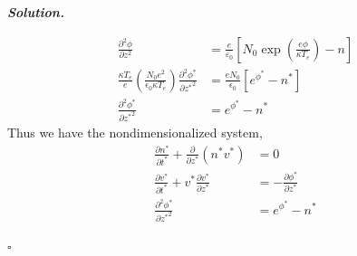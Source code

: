 \documentclass[12pt]{report}
\newenvironment{solution}[1][\it{Solution}]{\textbf{#1. } }{$\square$}
\def\eps{{\epsilon}}
\newcommand{\paren}[1]{{\left(#1\right)}} %
\newcommand{\pp}[2]{\frac{\partial #1}{\partial #2}} %
\newcommand{\ppn}[3]{\frac{\partial^{#1} #2}{\partial #3^{#1}}} %
\begin{document}
\begin{solution}
\begin{enumerate}
    \begin{align*}
        \ppn{2}{\phi}{z}&= \frac{e}{\varepsilon_0}\left[N_0 \exp\left(\frac{e\phi}{\kappa T_e}\right)-n\right]\\
        \frac{\kappa T_e}{e} \paren{\frac{N_0 e^2}{\epsilon_0 \kappa T_e}}\ppn{2}{{\phi^*}}{{z^*}} &= \frac{eN_0}{\eps_0} \left[ e^{\phi^*} - n^* \right]\\
        \ppn{2}{{\phi^*}}{{z^*}} &= e^{\phi^*} - n^*
    \end{align*}
    Thus we have the nondimensionalized system,
    \begin{align*}
        \pp{n^*}{t^*}+\pp{}{z^*}(n^*v^*)&=0\\
        \pp{v^*}{t^*}+v^*\pp{v^*}{z^*}&= -\pp{\phi^*}{z^*}\\
        \ppn{2}{{\phi^*}}{{z^*}}&= e^{\phi^*}-n^*    
    \end{align*}


\end{enumerate}
\end{solution}
\end{document}
